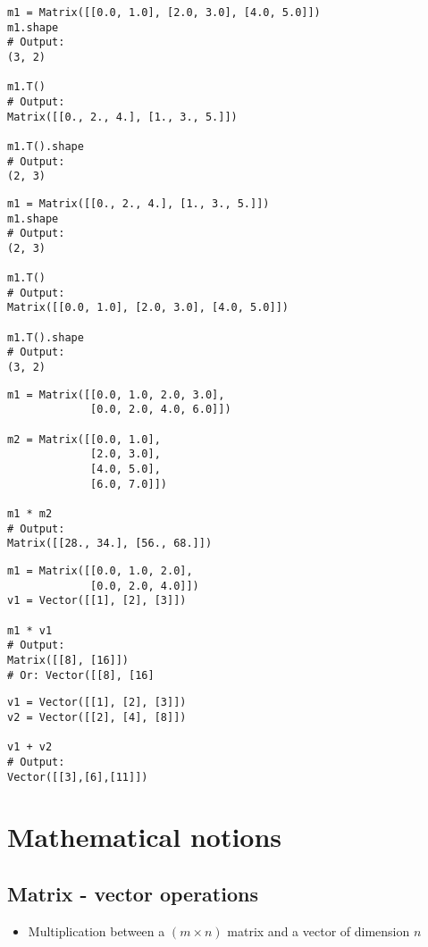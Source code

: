\begin{verbatim}
m1 = Matrix([[0.0, 1.0], [2.0, 3.0], [4.0, 5.0]])
m1.shape
# Output:
(3, 2)

m1.T()
# Output:
Matrix([[0., 2., 4.], [1., 3., 5.]])

m1.T().shape
# Output:
(2, 3)
\end{verbatim}
\begin{verbatim}
m1 = Matrix([[0., 2., 4.], [1., 3., 5.]])
m1.shape
# Output:
(2, 3)

m1.T()
# Output:
Matrix([[0.0, 1.0], [2.0, 3.0], [4.0, 5.0]])

m1.T().shape
# Output:
(3, 2)
\end{verbatim}
\begin{verbatim}
m1 = Matrix([[0.0, 1.0, 2.0, 3.0], 
             [0.0, 2.0, 4.0, 6.0]])

m2 = Matrix([[0.0, 1.0],
             [2.0, 3.0],
             [4.0, 5.0],
             [6.0, 7.0]])

m1 * m2
# Output:
Matrix([[28., 34.], [56., 68.]])
\end{verbatim}
\begin{verbatim}
m1 = Matrix([[0.0, 1.0, 2.0],
             [0.0, 2.0, 4.0]])
v1 = Vector([[1], [2], [3]])

m1 * v1
# Output:
Matrix([[8], [16]])
# Or: Vector([[8], [16]
\end{verbatim}
\begin{verbatim}
v1 = Vector([[1], [2], [3]])
v2 = Vector([[2], [4], [8]])

v1 + v2
# Output:
Vector([[3],[6],[11]])
\end{verbatim}

\newpage

\section*{Mathematical notions}
\subsection*{Matrix - vector operations}
\begin{itemize}
  \item Multiplication between a $(m \times n)$ matrix and a vector of dimension $n$
\end{itemize}

